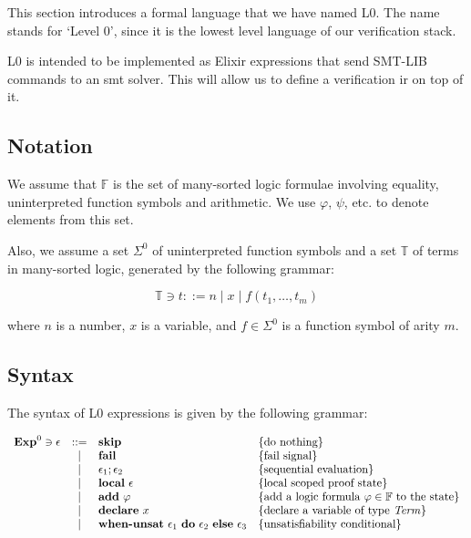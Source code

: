 This section introduces a formal language that we have named L0. The name stands
for `Level 0', since it is the lowest level language of our verification stack.

L0 is intended to be implemented as Elixir expressions that send SMT-LIB 
commands to an \acrshort{smt} solver. This will allow us to define a
verification \gls{ir} on top of it.

\subsection{Notation}

We assume that $\mathbb{F}$ is the set of many-sorted logic formulae involving
equality, uninterpreted function symbols and arithmetic. We use $\varphi$, 
$\psi$, etc. to denote elements from this set.

Also, we assume a set $\Sigma^{0}$ of uninterpreted function symbols and a set
$\mathbb{T}$ of terms in many-sorted logic, generated by the following grammar:

\[
\mathbb{T} \ni t ::= n \mid x \mid f(t_1, \ldots, t_m)
\]

where $n$ is a number, $x$ is a variable, and $f \in \Sigma^{0}$ is a function 
symbol of arity $m$.

\subsection{Syntax}

The syntax of L0 expressions is given by the following grammar:

\[
\begin{array}{rcll}
\mathbf{Exp}^{0} \ni \epsilon & ::= & \textbf{skip} & \{ \textrm{do nothing} \}\\
& | & \textbf{fail} & \{ \textrm{fail signal} \}\\
& | & \epsilon_1;\epsilon_2 & \{ \textrm{sequential evaluation} \}\\
& | & \textbf{local}~\epsilon & \{ \textrm{local scoped proof state} \}\\
& | & \textbf{add}~\varphi &  \{ \textrm{add a logic formula $\varphi \in \mathbb{F}$ to the state} \}\\
& | & \textbf{declare}~x &  \{ \textrm{declare a variable of type $\mathit{Term}$} \}\\
& | & \textbf{when-unsat}~\epsilon_1~\textbf{do}~\epsilon_2~\textbf{else}~\epsilon_3 &  \{ \textrm{unsatisfiability conditional} \}\\
\end{array}
\]

